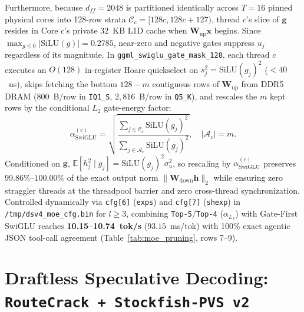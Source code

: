 \documentclass[10pt,twocolumn]{article}
\begin{document}
Furthermore, because $d_{ff}=2048$ is partitioned identically across $T=16$ pinned physical cores into 128-row strata $\mathcal{C}_c = [128c, 128c+127)$, thread $c$'s slice of $\mathbf{g}$ resides in Core $c$'s private 32~KB L1D cache when $\mathbf{W}_{\text{up}}\mathbf{x}$ begins. Since $\max_{g \le 0} |\text{SiLU}(g)| = 0.2785$, near-zero and negative gates suppress $u_j$ regardless of its magnitude. In \texttt{ggml\_swiglu\_gate\_mask\_128}, each thread $c$ executes an $O(128)$ in-register Hoare quickselect on $s_j^2 = \text{SiLU}(g_j)^2$ ($<40$~ns), skips fetching the bottom $128 - m$ contiguous rows of $\mathbf{W}_{\text{up}}$ from DDR5 DRAM ($800$~B/row in \texttt{IQ1\_S}, $2{,}816$~B/row in \texttt{Q5\_K}), and rescales the $m$ kept rows by the conditional $L_2$ gate-energy factor:
\begin{equation}
    \alpha_{\text{SwiGLU}}^{(c)} = \sqrt{\frac{\sum_{j \in \mathcal{C}_c} \text{SiLU}(g_j)^2}{\sum_{j \in \mathcal{A}_c} \text{SiLU}(g_j)^2}}, \quad |\mathcal{A}_c| = m.
\end{equation}
Conditioned on $\mathbf{g}$, $\mathbb{E}[h_j^2 \mid g_j] = \text{SiLU}(g_j)^2 \sigma_u^2$, so rescaling by $\alpha_{\text{SwiGLU}}^{(c)}$ preserves $99.86\%\text{--}100.00\%$ of the exact output norm $\|\mathbf{W}_{\text{down}}\mathbf{h}\|_2$ while ensuring zero straggler threads at the threadpool barrier and zero cross-thread synchronization. Controlled dynamically via \texttt{cfg[6]} (\texttt{exps}) and \texttt{cfg[7]} (\texttt{shexp}) in \texttt{/tmp/dsv4\_moe\_cfg.bin} for $l \ge 3$, combining \texttt{Top-5}/\texttt{Top-4} ($\alpha_{L_2}$) with Gate-First SwiGLU reaches \textbf{10.15--10.74~tok/s} ($93.15$~ms/tok) with 100\% exact agentic JSON tool-call agreement (Table~\ref{tab:moe_pruning}, rows 7--9).

\section{Draftless Speculative Decoding: \texttt{RouteCrack + Stockfish-PVS v2}}
\label{sec:spec}
\end{document}
